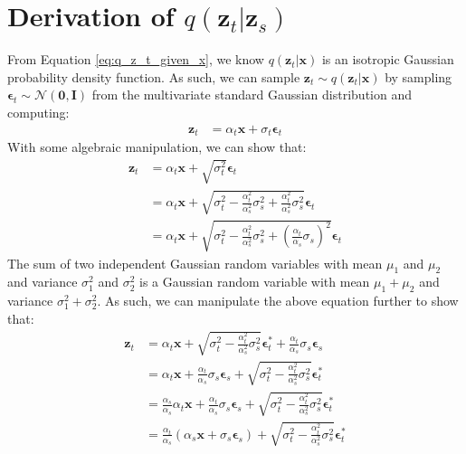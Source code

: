 \documentclass[ oneside,%
                    author={George Herbert},
                    degree={MSci},
                     title={Video Diffusion Models for Climate Simulations},
                  subtitle={}]{dissertation}
\begin{document}
\section{Derivation of $q(\mathbf{z}_t|\mathbf{z}_s)$}
\label{appx:diffusion_q_z_t_given_z_s}

From Equation \ref{eq:q_z_t_given_x}, we know $q(\mathbf{z}_t|\mathbf{x})$ is an isotropic Gaussian probability density function. As such, we can sample $\mathbf{z}_t\sim q(\mathbf{z}_t|\mathbf{x})$ by sampling $\boldsymbol\epsilon_t\sim\mathcal{N}(\mathbf{0}, \mathbf{I})$ from the multivariate standard Gaussian distribution and computing:
\begin{align}
      \mathbf{z}_t&=\alpha_t\mathbf{x}+\sigma_t\boldsymbol\epsilon_t\label{eq:z_t}
\end{align}
With some algebraic manipulation, we can show that:
\begin{align}
      \mathbf{z}_t&=\alpha_t\mathbf{x}+\sqrt{\sigma_t^2}\boldsymbol\epsilon_t\\
      &=\alpha_t\mathbf{x}+\sqrt{\sigma_t^2-\frac{\alpha_t^2}{\alpha_s^2}\sigma_s^2+\frac{\alpha_t^2}{\alpha_s^2}\sigma_s^2}\boldsymbol\epsilon_t\\
      &=\alpha_t\mathbf{x}+\sqrt{\sigma_t^2-\frac{\alpha_t^2}{\alpha_s^2}\sigma_s^2+\left(\frac{\alpha_t}{\alpha_s}\sigma_s\right)^2}\boldsymbol\epsilon_t
\end{align}
The sum of two independent Gaussian random variables with mean $\mu_1$ and $\mu_2$ and variance $\sigma_1^2$ and $\sigma_2^2$ is a Gaussian random variable with mean $\mu_1+\mu_2$ and variance $\sigma_1^2+\sigma_2^2$. As such, we can manipulate the above equation further to show that:
\begin{align}
      \mathbf{z}_t&=\alpha_t\mathbf{x}+\sqrt{\sigma_t^2-\frac{\alpha_t^2}{\alpha_s^2}\sigma_s^2}\boldsymbol\epsilon_t^*+\frac{\alpha_t}{\alpha_s}\sigma_s\boldsymbol\epsilon_s\\
      &=\alpha_t\mathbf{x}+\frac{\alpha_t}{\alpha_s}\sigma_s\boldsymbol\epsilon_s+\sqrt{\sigma_t^2-\frac{\alpha_t^2}{\alpha_s^2}\sigma_s^2}\boldsymbol\epsilon_t^*\\
      &=\frac{\alpha_s}{\alpha_s}\alpha_t\mathbf{x}+\frac{\alpha_t}{\alpha_s}\sigma_s\boldsymbol\epsilon_s+\sqrt{\sigma_t^2-\frac{\alpha_t^2}{\alpha_s^2}\sigma_s^2}\boldsymbol\epsilon_t^*\\
      &=\frac{\alpha_t}{\alpha_s}(\alpha_s\mathbf{x}+\sigma_s\boldsymbol\epsilon_s)+\sqrt{\sigma_t^2-\frac{\alpha_t^2}{\alpha_s^2}\sigma_s^2}\boldsymbol\epsilon_t^*\\
\end{align}
\end{document}

